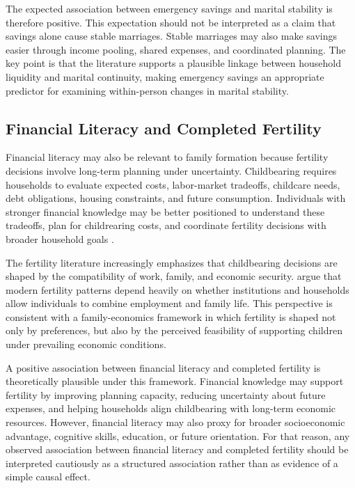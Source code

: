 \documentclass[12pt]{article}
\begin{document}
The expected association between emergency savings and marital stability is therefore positive. This expectation should not be interpreted as a claim that savings alone cause stable marriages. Stable marriages may also make savings easier through income pooling, shared expenses, and coordinated planning. The key point is that the literature supports a plausible linkage between household liquidity and marital continuity, making emergency savings an appropriate predictor for examining within-person changes in marital stability.

\subsection{Financial Literacy and Completed Fertility}

Financial literacy may also be relevant to family formation because fertility decisions involve long-term planning under uncertainty. Childbearing requires households to evaluate expected costs, labor-market tradeoffs, childcare needs, debt obligations, housing constraints, and future consumption. Individuals with stronger financial knowledge may be better positioned to understand these tradeoffs, plan for childrearing costs, and coordinate fertility decisions with broader household goals \citep{lusardi2011}.

The fertility literature increasingly emphasizes that childbearing decisions are shaped by the compatibility of work, family, and economic security. \citet{doepke2022} argue that modern fertility patterns depend heavily on whether institutions and households allow individuals to combine employment and family life. This perspective is consistent with a family-economics framework in which fertility is shaped not only by preferences, but also by the perceived feasibility of supporting children under prevailing economic conditions.

A positive association between financial literacy and completed fertility is theoretically plausible under this framework. Financial knowledge may support fertility by improving planning capacity, reducing uncertainty about future expenses, and helping households align childbearing with long-term economic resources. However, financial literacy may also proxy for broader socioeconomic advantage, cognitive skills, education, or future orientation. For that reason, any observed association between financial literacy and completed fertility should be interpreted cautiously as a structured association rather than as evidence of a simple causal effect.
\end{document}
